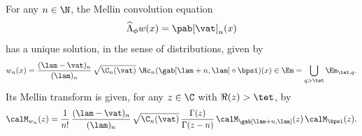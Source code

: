 \begin{proposition}
\label{prop:Convolution}
For any $n \in \N$, the Mellin convolution equation
\begin{equation}
\label{eq:equation_w_n1}
\widehat{\Lambda}_{\phi} w (x) = \pab[\vat]_n(x)
\end{equation}
has a unique solution, in the sense of distributions, given by
\begin{equation}
\label{eq:w_n}
w_n(x) = \frac{(\lam-\vat)_n}{(\lam)_n}\, \sqrt{\C_n(\vat)} \ \Rc_n (\gab[\lam+n,\lam] \diamond \bpsi) (x) \in \Em = \bigcup_{q>\tet}\Em_{\tet,q}.
\end{equation}
Its Mellin transform is given, for any $z \in \C$ with $\Re(z)>\tet$, by
\begin{equation}
\label{eq:Mellin_w_n}
\calM_{w_n}(z) = \frac{1}{n!}\, \frac{(\lam-\vat)_n}{(\lam)_n}\, \sqrt{\C_n(\vat)}\, \frac{\Gamma(z)}{\Gamma(z-n)}\, \calM_{\gab[\lam+n,\lam]}(z)\, \calM_\bpsi(z).
\end{equation}
\end{proposition}

